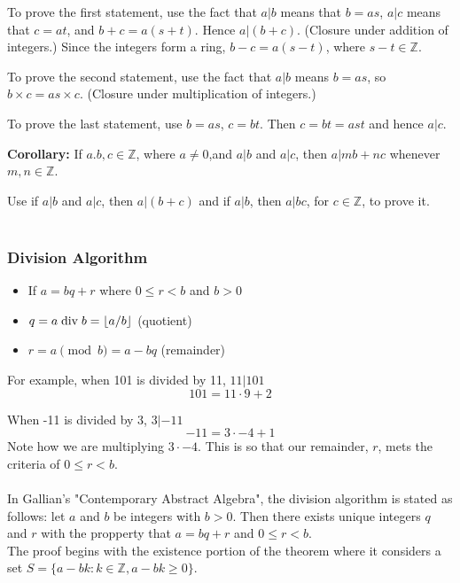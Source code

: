 To prove the first statement, use the fact that $a|b$ means that $b = as$,
$a|c$ means that $c=at$,
and $b+c = a(s+t)$.
Hence $a|(b+c)$.
(Closure under addition of integers.)
Since the integers form a ring, $b-c = a(s-t)$, where $s-t \in \mathbb{Z}$.

To prove the second statement, use the fact that $a|b$ means $b = as$, so $b\times c = as \times c$.
(Closure under multiplication of integers.)

To prove the last statement, use $b = as$, $c = bt$. Then $c = bt = ast$ and hence $a|c$.

\textbf{Corollary:}
If $a. b, c \in \mathbb{Z}$, where $a \neq 0$,and $a|b$ and $a|c$, then $a|mb + nc$ whenever $m, n \in \mathbb{Z}$.

Use if $a|b$ and $a|c$, then $a|(b+c)$ and if $a|b$, then $a|bc$,
for $c \in \mathbb{Z}$, to prove it.
\\~\\


\subsubsection{Division Algorithm}

\begin{itemize}
\item If $a = bq + r$ where $0 \leq r < b$ and $b>0$
\item $q = a \bdiv b = \lfloor a/b \rfloor$ (quotient)
\item $r = a \pmod b = a - bq$ (remainder)
\end{itemize}

For example, when 101 is divided by 11, $11|101$
$$
101 = 11 \cdot 9 + 2
$$

When -11 is divided by 3, $3|-11$
$$
-11 = 3 \cdot -4 + 1
$$
Note how we are multiplying $3\cdot -4$. This is so that our remainder, $r$, mets the criteria
of $0 \leq r < b$.
\\~\\


\label{mod-arithmetic:gallian-division-proof}
In Gallian's "Contemporary Abstract Algebra", the division algorithm is stated as follows:
let $a$ and $b$ be integers with $b>0$.
Then there exists unique integers $q$ and $r$ with the propperty that
$a = bq +r$ and $0 \leq r < b$.
\\

The proof begins with the existence portion of the theorem where it considers a set
$S = \{ a - bk : k\in\mathbb{Z}, a - bk \geq 0 \}$.

